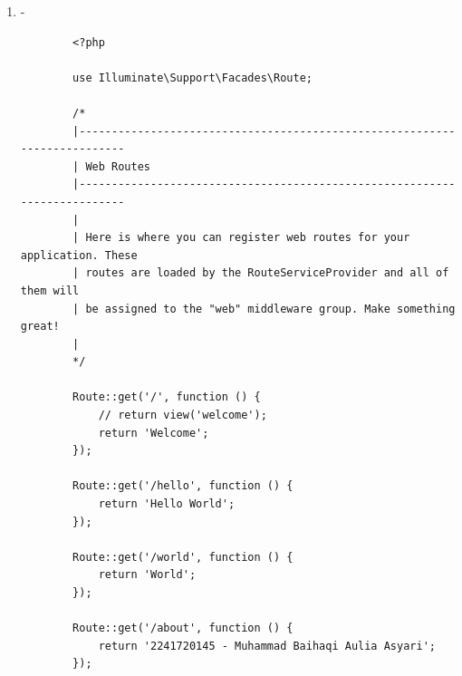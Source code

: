 \documentclass[12pt,titlepage]{article}
\begin{document}
\begin{enumerate}[label=\alph*.]
\begin{verbatim}
        use Illuminate\Support\Facades\Route;
        
        /*
        |--------------------------------------------------------------------------
        | Web Routes
        |--------------------------------------------------------------------------
        |
        | Here is where you can register web routes for your application. These
        | routes are loaded by the RouteServiceProvider and all of them will
        | be assigned to the "web" middleware group. Make something great!
        |
        */
        
        Route::get('/', function () {
            // return view('welcome');
            return 'Welcome';
        });
        
        Route::get('/hello', function () {
            return 'Hello World';
        });
        
        Route::get('/world', function () {
            return 'World';
        });
    \end{verbatim}
    \newpage
    \item -
    \begin{verbatim}
        <?php

        use Illuminate\Support\Facades\Route;
        
        /*
        |--------------------------------------------------------------------------
        | Web Routes
        |--------------------------------------------------------------------------
        |
        | Here is where you can register web routes for your application. These
        | routes are loaded by the RouteServiceProvider and all of them will
        | be assigned to the "web" middleware group. Make something great!
        |
        */
        
        Route::get('/', function () {
            // return view('welcome');
            return 'Welcome';
        });
        
        Route::get('/hello', function () {
            return 'Hello World';
        });
        
        Route::get('/world', function () {
            return 'World';
        }); 
        
        Route::get('/about', function () {
            return '2241720145 - Muhammad Baihaqi Aulia Asyari';
        });
    \end{verbatim}
\end{enumerate}

\newpage
\end{document}
